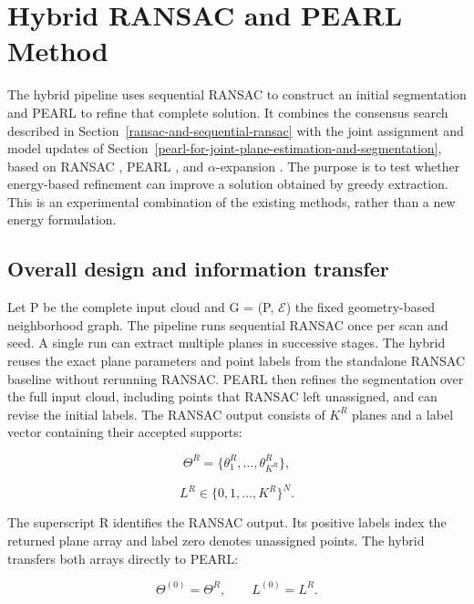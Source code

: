 \section{Hybrid RANSAC and PEARL Method}\label{hybrid-ransac-and-pearl-method}

The hybrid pipeline uses sequential RANSAC to construct an initial segmentation and PEARL to refine that complete solution. It combines the consensus search described in Section~\ref{ransac-and-sequential-ransac} with the joint assignment and model updates of Section~\ref{pearl-for-joint-plane-estimation-and-segmentation}, based on RANSAC \cite{fischler1981ransac}, PEARL \cite{isack2012energy}, and \(\alpha\)-expansion \cite{boykov2001graphcuts}. The purpose is to test whether energy-based refinement can improve a solution obtained by greedy extraction. This is an experimental combination of the existing methods, rather than a new energy formulation.

\subsection{Overall design and information transfer}\label{overall-design-and-information-transfer}

Let P be the complete input cloud and G = (P, \(\mathcal E\)) the fixed geometry-based neighborhood graph. The pipeline runs sequential RANSAC once per scan and seed. A single run can extract multiple planes in successive stages. The hybrid reuses the exact plane parameters and point labels from the standalone RANSAC baseline without rerunning RANSAC. PEARL then refines the segmentation over the full input cloud, including points that RANSAC left unassigned, and can revise the initial labels. The RANSAC output consists of \(K^{R}\) planes and a label vector containing their accepted supports:

\begin{equation}
\Theta^R=\{\theta_1^R,\ldots,\theta_{K^R}^R\},
\label{eq:43}
\end{equation}

\begin{equation}
L^R\in\{0,1,\ldots,K^R\}^N.
\label{eq:44}
\end{equation}

The superscript R identifies the RANSAC output. Its positive labels index the returned plane array and label zero denotes unassigned points. The hybrid transfers both arrays directly to PEARL:

\begin{equation}
\Theta^{(0)}=\Theta^R,\qquad L^{(0)}=L^R.
\label{eq:45}
\end{equation}

